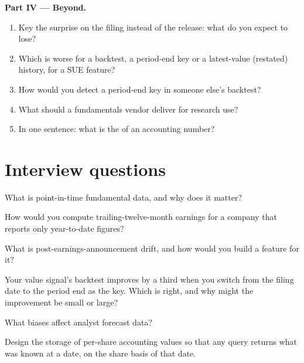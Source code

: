 \begin{problem}
\medskip\noindent\textbf{Part IV --- Beyond.}
\begin{enumerate}[resume]
\item Key the surprise on the filing instead of the release: what do you expect to lose?
\item Which is worse for a backtest, a period-end key or a latest-value (restated) history, for a SUE feature?
\item How would you detect a period-end key in someone else's backtest?
\item What should a fundamentals vendor deliver for research use?
\item In one sentence: what is the  of an accounting number?
\end{enumerate}
\end{problem}

\section{Interview questions}

\begin{interviewq}\label{iq:rs:fundamental-analyst-and-event-features:1}
What is point-in-time fundamental data, and why does it matter?
\end{interviewq}

\begin{interviewq}\label{iq:rs:fundamental-analyst-and-event-features:2}
How would you compute trailing-twelve-month earnings for a company that reports only year-to-date figures?
\end{interviewq}

\begin{interviewq}\label{iq:rs:fundamental-analyst-and-event-features:3}
What is post-earnings-announcement drift, and how would you build a feature for it?
\end{interviewq}

\begin{interviewq}\label{iq:rs:fundamental-analyst-and-event-features:4}
Your value signal's backtest improves by a third when you switch from the filing date to the period end as the key. Which is right, and
why might the improvement be small or large?
\end{interviewq}

\begin{interviewq}\label{iq:rs:fundamental-analyst-and-event-features:5}
What biases affect analyst forecast data?
\end{interviewq}

\begin{interviewq}\label{iq:rs:fundamental-analyst-and-event-features:6}
Design the storage of per-share accounting values so that any query returns what was known at a date, on the share basis of that date.
\end{interviewq}
